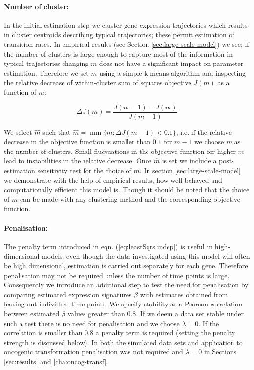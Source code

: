 \paragraph{Number of cluster:}
\label{sec:number-cluster}

In the initial estimation step we cluster gene expression trajectories which results in cluster centroids describing typical trajectories; these permit estimation of transition rates. In empirical results (see Section \ref{sec:large-scale-model}) we see; if the number of clusters is large enough to capture most of the information in typical trajectories changing $m$ does not have a significant impact on parameter estimation. Therefore we set $m$ using a simple k-means algorithm and inspecting the relative decrease of within-cluster sum of squares objective $J(m)$ as a function of $m$:

\[
\Delta J(m) = \frac{J(m-1) - J(m)}{J(m - 1)}
\]

We select $\hat{m}$  such that $\hat{m} = \min \lbrace m : \Delta J(m-1) < 0.1 \rbrace$, i.e. if the relative decrease in the objective function is smaller than $0.1$ for $m-1$ we choose $m$ as the number of clusters. Small fluctuations in the objective function for higher $m$ lead to instabilities in the relative decrease. Once $\hat{m}$ is set we include a post-estimation sensitivity test for the choice of $m$. In section \ref{sec:large-scale-model} we demonstrate with the help of empirical results, how well behaved and computationally efficient this model is. Though it should be noted that the choice of $m$ can be made with any clustering method and the corresponding objective function.

\paragraph{Penalisation:}
\label{sec:penalization}

The penalty term introduced in eqn. (\ref{eq:leastSqrs.indep}) is useful in high-dimensional models; even though the data investigated using this model will often be high dimensional, estimation is carried out separately for each gene. Therefore penalisation may not be required unless the number of time points is large. Consequently we introduce an additional step to test the need for penalisation by comparing estimated expression signatures $\beta$ with estimates obtained from leaving out individual time points. We specify stability as a Pearson correlation between estimated $\beta$ values  greater than $0.8$. If we deem a data set stable under such a test there is no need for penalisation and we choose $\lambda=0$. If the correlation is smaller than $0.8$ a penalty term is required (setting the penalty strength is discussed below). In both the simulated data sets and application to oncogenic transformation penalisation was not required and $\lambda=0$ in Sections \ref{sec:results} and \ref{cha:oncog-transf}. 


